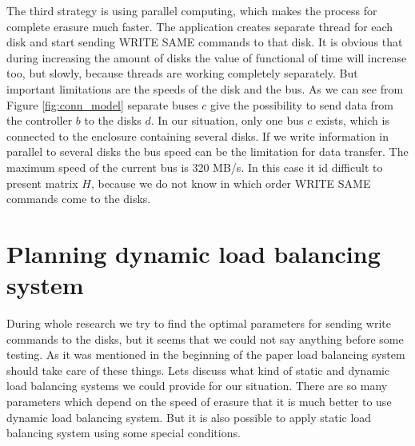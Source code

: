 The third strategy is using parallel computing, which makes the process for complete erasure much faster. The application creates separate thread for each disk and start sending WRITE SAME commands to that disk. It is obvious that during increasing the amount of disks the value of functional of time will increase too, but slowly, because threads are working completely separately. But important limitations are the speeds of the disk and the bus. As we can see from Figure \ref{fig:conn_model} separate buses $c$ give the possibility to send data from the controller $b$ to the disks $d$. In our situation, only one bus $c$ exists, which is connected to the enclosure containing several disks. If we write information in parallel to several disks the bus speed can be the limitation for data transfer. The maximum speed of the current bus is 320 MB/s. In this case it id difficult to present matrix $H$, because we do not know in which order WRITE SAME commands come to the disks.


\section{Planning dynamic load balancing system}

During whole research we try to find the optimal parameters for sending write commands to the disks, but it seems that we could not say anything before some testing. As it was mentioned in the beginning of the paper load balancing system should take care of these things. Lets discuss what kind of static and dynamic load balancing systems we could provide for our situation. There are so many parameters which depend on the speed of erasure that it is much better to use dynamic load balancing system. But it is also possible to apply static load balancing system using some special conditions.

